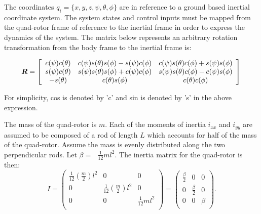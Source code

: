 The coordinates  $ q_i=\{x,y,z,\psi ,\theta ,\phi \} $  are in reference to a ground based inertial coordinate system. The system states and control inputs must be mapped from the quad-rotor frame of reference to the inertial frame in order to express the dynamics of the system. The matrix below represents an arbitrary rotation transformation from the body frame to the inertial frame is:

\begin{equation}
\boldsymbol R = \left[ \begin{array}{ccc}
c(\psi) c(\theta) & c(\psi) s(\theta) s(\phi) - s(\psi) c(\phi) & c(\psi) s(\theta) c(\phi) + s(\psi) s(\phi)\\
s(\psi) c(\theta) & s(\psi) s(\theta) s(\phi) + c(\psi) c(\phi) & s(\psi) s(\theta) c(\phi) - c(\psi) s(\phi)\\
-s(\theta) & c(\theta) s(\phi) & c(\theta) c(\phi)\\
\end{array} \right]\\
\end{equation}

For simplicity, cos is denoted by 'c' and sin is denoted by 's' in the above expression. 



\noindent 
The mass of the quad-rotor is $m$. Each of the moments of inertia  $ i_{xx} $  and $ i_{yy} $
are assumed to be composed of a rod of length $ L $   which accounts for half of the mass of the quad-rotor. Assume the mass
is evenly distributed along the two perpendicular rods. Let  \(\beta  =\text{  }\frac{1}{12}m l^2 \). The inertia matrix for the quad-rotor is then: \\

\begin{equation}
I = \left(
\begin{array}{ccc}
 \frac{1}{12}\left(\frac{m}{2}\right)l^2 & 0 & 0 \\
 0 & \frac{1}{12}\left(\frac{m}{2}\right)l^2 & 0 \\
 0 & 0 & \frac{1}{12}m l^2 \\
\end{array}
\right) = \left(
\begin{array}{ccc}
 \frac{\beta }{2} & 0 & 0 \\
 0 & \frac{\beta }{2} & 0 \\
 0 & 0 & \beta  \\
\end{array}
\right).
\end{equation}

